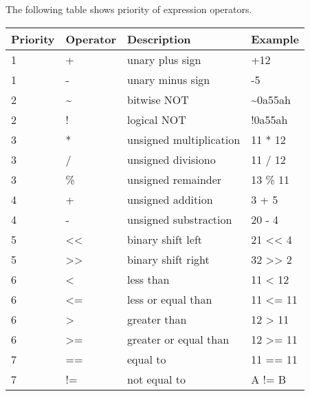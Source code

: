         The following table shows priority of expression operators.
        \begin{table}[h!]
            \centering{}
            \mysmallfont{}

            \begin{tabular}{|l|l|l|l|}
                \hline
                Priority & Operator & Description             & Example         \\\hline
                1        & +        & unary plus sign         & +12             \\\hline
                1        & -        & unary minus sign        & -5              \\\hline
                2        & \~{}     & bitwise NOT             & \~{}0a55ah      \\\hline
                2        & !        & logical NOT             & !0a55ah         \\\hline
                3        & *        & unsigned multiplication & 11 * 12         \\\hline
                3        & /        & unsigned divisiono      & 11 / 12         \\\hline
                3        & \%       & unsigned remainder      & 13 \% 11        \\\hline
                4        & +        & unsigned addition       & 3 + 5           \\\hline
                4        & -        & unsigned substraction   & 20 - 4          \\\hline
                5        & <{}<     & binary shift left       & 21 <{}< 4       \\\hline
                5        & >{}>     & binary shift right      & 32 >{}> 2       \\\hline
                6        & <        & less than               & 11 < 12         \\\hline
                6        & <=       & less or equal than      & 11 <= 11        \\\hline
                6        &  >       & greater than            & 12 > 11         \\\hline
                6        & >=       & greater or equal than   & 12 >= 11        \\\hline
                7        & ==       & equal to                & 11 == 11        \\\hline
                7        & !=       & not equal to            &  A != B         \\\hline

\end{tabular}
\end{table}
